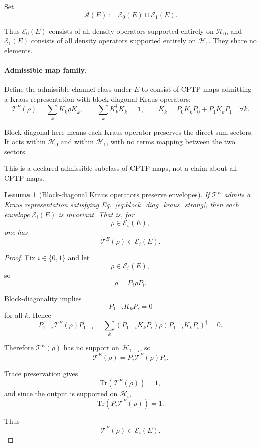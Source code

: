 \documentclass[aps,prx,onecolumn,11pt]{revtex4-2}
\theoremstyle{plain}
\newtheorem{lemma}{Lemma}
\theoremstyle{definition}
\theoremstyle{remark}
\begin{document}
Set
\[
\mathcal A(E):=\mathcal E_0(E)\sqcup\mathcal E_1(E).
\]

Thus \(\mathcal E_0(E)\) consists of all density operators supported
entirely on \(\mathcal H_0\), and \(\mathcal E_1(E)\) consists of all
density operators supported entirely on \(\mathcal H_1\). They share no
elements.

\paragraph{Admissible map family.}

Define the admissible channel class under \(E\) to consist of CPTP maps
admitting a Kraus representation with block-diagonal Kraus operators:
\begin{equation}
\mathcal T^E(\rho)
=
\sum_k K_k\rho K_k^\dagger,
\qquad
\sum_k K_k^\dagger K_k=\mathbf 1,
\qquad
K_k=P_0K_kP_0+P_1K_kP_1
\quad
\forall k.
\label{eq:block_diag_kraus_strong}
\end{equation}

Block-diagonal here means each Kraus operator preserves the direct-sum
sectors. It acts within \(\mathcal H_0\) and within \(\mathcal H_1\),
with no terms mapping between the two sectors.

This is a declared admissible subclass of CPTP maps, not a claim about
all CPTP maps.

\begin{lemma}[Block-diagonal Kraus operators preserve envelopes]
\label{lem:block_diag_preserves_env}
If \(\mathcal T^E\) admits a Kraus representation satisfying
Eq.~\eqref{eq:block_diag_kraus_strong}, then each envelope
\(\mathcal E_i(E)\) is invariant. That is, for
\[
\rho\in\mathcal E_i(E),
\]
one has
\[
\mathcal T^E(\rho)\in\mathcal E_i(E).
\]
\end{lemma}

\begin{proof}
Fix \(i\in\{0,1\}\) and let
\[
\rho\in\mathcal E_i(E),
\]
so
\[
\rho=P_i\rho P_i.
\]

Block-diagonality implies
\[
P_{1-i}K_kP_i=0
\]
for all \(k\). Hence
\[
P_{1-i}\mathcal T^E(\rho)P_{1-i}
=
\sum_k
(P_{1-i}K_kP_i)\rho(P_{1-i}K_kP_i)^\dagger
=
0.
\]

Therefore \(\mathcal T^E(\rho)\) has no support on
\(\mathcal H_{1-i}\), so
\[
\mathcal T^E(\rho)
=
P_i\mathcal T^E(\rho)P_i.
\]

Trace preservation gives
\[
\mathrm{Tr}(\mathcal T^E(\rho))=1,
\]
and since the output is supported on \(\mathcal H_i\),
\[
\mathrm{Tr}(P_i\mathcal T^E(\rho))=1.
\]

Thus
\[
\mathcal T^E(\rho)\in\mathcal E_i(E).
\]
\end{proof}
\end{document}

